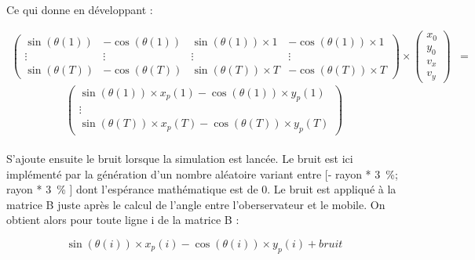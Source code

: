 \documentclass[a4paper,11pt]{article}
\begin{document}
		\paragraph{}
		Ce qui donne en développant :

		\begin{equation}
				\begin{align*}
				\begin{pmatrix}
					\sin(\theta(1)) & -\cos(\theta(1))  & \sin(\theta(1))\times 1 & -\cos(\theta(1))\times 1  \\
					\vdots & \vdots  & \vdots & \vdots  \\
					\sin(\theta(T))  & -\cos(\theta(T))  &  \sin(\theta(T))\times T  &  -\cos(\theta(T))\times T
				\end{pmatrix}
				\times
				\begin{pmatrix}
				 x_0 \\
				 y_0 \\ 
				 v_x \\
				 v_y 
				\end{pmatrix}
				&= 
				\end{align*}
		\end{equation}
		\begin{equation*}
				\begin{pmatrix}
					\sin(\theta(1)) \times x_p(1) - \cos(\theta(1)) \times y_p(1)  \\
					\vdots \\
					\sin(\theta(T)) \times x_p(T) - \cos(\theta(T)) \times y_p(T)  
				\end{pmatrix}
		\end{equation*}

		\paragraph{}
		S'ajoute ensuite le bruit lorsque la simulation est lancée. Le bruit est ici implémenté par la génération d'un nombre aléatoire variant entre [- rayon * 3 \%; rayon * 3 \% ] dont l’espérance mathématique est de 0.
		Le bruit est appliqué à la matrice B juste après le calcul de l'angle entre l'oberservateur et le mobile. 
		On obtient alors pour toute ligne i de la matrice B :

			\begin{equation} 
				\sin(\theta(i)) \times x_p(i) - \cos(\theta(i)) \times y_p(i) + bruit
			\end{equation}

		\newpage
\end{document}
